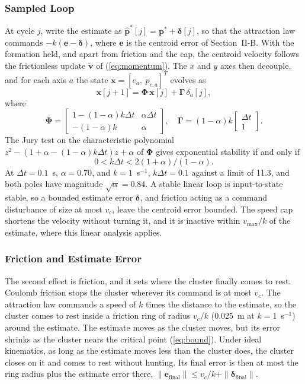 \documentclass[lettersize,journal]{IEEEtran}
\newcommand{\rev}[1]{#1}
\begin{document}
\subsubsection{Sampled Loop}
At cycle $j$, write the estimate as $\hat{\mathbf{p}}^*[j] = \mathbf{p}^* + \boldsymbol{\delta}[j]$, so that the attraction law commands $-k(\mathbf{e} - \boldsymbol{\delta})$, where $\mathbf{e}$ is the centroid error of Section~II-B. With the formation held, and apart from friction and the cap, the centroid velocity follows the frictionless update $\tilde{\mathbf{v}}$ of (\ref{eq:momentum}). The $x$ and $y$ axes then decouple, and for each axis $a$ the state $\mathbf{x} = [e_a,\ \dot{p}_{c,a}]^T$ evolves as
\begin{equation}\label{eq:cl}
\mathbf{x}[j{+}1] = \boldsymbol{\Phi}\,\mathbf{x}[j] + \boldsymbol{\Gamma}\,\delta_a[j],
\end{equation}
where
\[
\boldsymbol{\Phi} = \begin{bmatrix} 1{-}(1{-}\alpha)k\Delta t & \alpha\Delta t \\ -(1{-}\alpha)k & \alpha \end{bmatrix}, \quad \boldsymbol{\Gamma} = (1{-}\alpha)k\begin{bmatrix}\Delta t\\ 1\end{bmatrix}.
\]
The Jury test on the characteristic polynomial $z^2 - (1 + \alpha - (1-\alpha)k\Delta t)z + \alpha$ of $\boldsymbol{\Phi}$ gives exponential stability if and only if
\begin{equation}\label{eq:kmax}
0 < k\Delta t < 2(1+\alpha)/(1-\alpha).
\end{equation}
At $\Delta t = 0.1$~s, $\alpha = 0.70$, and $k = 1$~s$^{-1}$, $k\Delta t = 0.1$ against a limit of \rev{11.3}, and both poles have magnitude $\sqrt{\alpha} = \rev{0.84}$.
A stable linear loop is input-to-state stable, so a bounded estimate error $\boldsymbol{\delta}$, and friction acting as a command disturbance of size at most $v_c$, leave the centroid error bounded. The speed cap shortens the velocity without turning it, and it is inactive within $v_{\max}/k$ of the estimate, where this linear analysis applies.

\subsubsection{Friction and Estimate Error}
The second effect is friction, and it sets where the cluster finally comes to rest. Coulomb friction stops the cluster wherever its command is at most $v_c$. The attraction law commands a speed of $k$ times the distance to the estimate, so the cluster comes to rest inside a friction ring of radius $v_c/k$ (0.025~m at $k = 1$~s$^{-1}$) around the estimate. The estimate moves as the cluster moves, but its error shrinks as the cluster nears the critical point (\ref{eq:bound}). Under ideal kinematics, as long as the estimate moves less than the cluster does, the cluster closes on it and comes to rest without hunting. Its final error is then at most the ring radius plus the estimate error there, $\|\mathbf{e}_{\text{final}}\| \le v_c/k + \|\boldsymbol{\delta}_{\text{final}}\|$.
\end{document}
